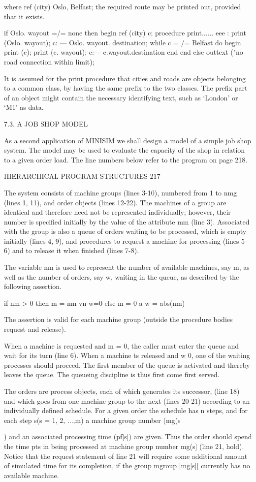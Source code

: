 {{{{{		where ref (city) Oslo, Belfast; the required route may be printed out, provided that it exists.
		
		if Oslo. wayout =/= none then begin ref (city) c; procedure print...... eee : print (Oslo. wayout); c: — Oslo. wayout. destination; while c = /= Belfast do begin print (c); print (c. wayout); c:— c.wayout.destination end end else outtext ("no road connection within limit);
		
		It is assumed for the print procedure that cities and roads are objects belonging to a common class, by having the same prefix to the two classes. The prefix part of an object might contain the necessary identifying text, such as ‘London’ or ‘M1’ as data.
		
		7.3. A JOB SHOP MODEL
		
		As a second application of MINISIM we shall design a model of a simple job shop system. The model may be used to evaluate the capacity of the shop in relation to a given order load. The line numbers below refer to the program on page 218.
		
		HIERARCHICAL PROGRAM STRUCTURES 217
		
		The system consists of machine groups (lines 3-10), numbered from 1 to nmg (lines 1, 11), and order objects (lines 12-22). The machines of a group are identical and therefore need not be represented individually; however, their number is specified initially by the value of the attribute mm (line 3). Associated with the group is also a queue of orders waiting to be processed, which is empty initially (lines 4, 9), and procedures to request a machine for processing (lines 5-6) and to release it when finished (lines 7-8).
		
		The variable nm is used to represent the number of available machines, say m, as well as the number of orders, say w, waiting in the queue, as described by the following assertion.
		
		if nm > 0 then m = nm vn w=0 else m = 0 a w = abs(nm)
		
		The assertion is valid for each machine group (outside the procedure bodies request and release).
		
		When a machine is requested and m = 0, the caller must enter the queue and wait for its turn (line 6). When a machine ts released and w 0, one of the waiting processes should proceed. The first member of the queue is activated and thereby leaves the queue. The queueing discipline is thus first come first served.
		
		The orders are process objects, each of which generates its successor, (line 18) and which goes from one machine group to the next (lines 20-21) according to an individually defined schedule. For a given order the schedule has n steps, and for each step s(s = 1, 2, ...,m) a machine group number (mg(s}) and an associated processing time (pf[s]) are given. Thus the order should spend the time pt{s} in being processed at machine group number mg(s] (line 21, hold). Notice that the request statement of line 21 will require some additional amount of simulated time for its completion, if the group mgroup [mg[s]] currently has no available machine.
	
}}}}

